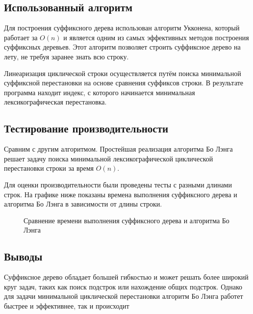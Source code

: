 \documentclass[12pt]{article}
\begin{document}
\subsection*{Использованный алгоритм}

Для построения суффиксного дерева использован алгоритм Укконена, который работает за $O(n)$ и является одним из самых эффективных методов построения суффиксных деревьев. Этот алгоритм позволяет строить суффиксное дерево на лету, не требуя заранее знать всю строку.

Линеаризация циклической строки осуществляется путём поиска минимальной суффиксной перестановки на основе сравнения суффиксов строки. В результате программа находит индекс, с которого начинается минимальная лексикографическая перестановка.


\subsection*{Тестирование производительности}
Сравним с другим алгоритмом. Простейшая реализация алгоритма Бо Лэнга решает задачу поиска минимальной лексикографической циклической перестановки строки за время $O(n)$.

Для оценки производительности были проведены тесты с разными длинами строк. На графике ниже показаны времена выполнения суффиксного дерева и алгоритма Бо Лэнга в зависимости от длины строки.

\begin{figure}[htbp]
    \centering
    \caption{Сравнение времени выполнения суффиксного дерева и алгоритма Бо Лэнга}
\end{figure}


\newpage
\subsection*{Выводы}

Суффиксное дерево обладает большей гибкостью и может решать более широкий круг задач, таких как поиск подстрок или нахождение общих подстрок. Однако для задачи минимальной циклической перестановки алгоритм Бо Лэнга работет быстрее и эффективнее, так и происходит
\end{document}
